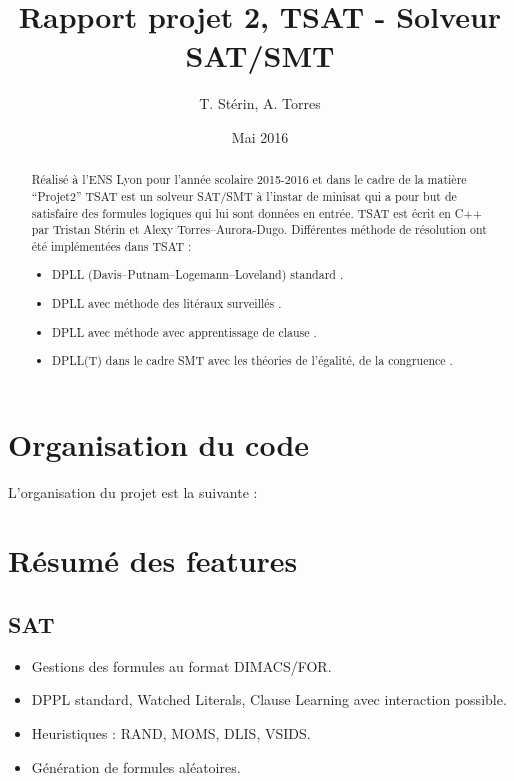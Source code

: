 \documentclass{article}
\title{Rapport projet 2, TSAT - Solveur SAT/SMT}
\author{T. Stérin, A. Torres}
\date{Mai 2016}
\newcommand{\litt}{\alpha}
\newcommand{\non}[1]{\overline{#1}}
\begin{document}
\maketitle

\begin{abstract}
Réalisé à l'ENS Lyon pour l'année scolaire 2015-2016 et dans le cadre de la matière ``Projet2'' TSAT est un solveur SAT/SMT à l'instar de minisat \cite{minisat} qui a pour but de satisfaire des formules logiques qui lui sont données en entrée.
TSAT est écrit en C++ par Tristan Stérin et Alexy Torres--Aurora-Dugo.
Différentes méthode de résolution ont été implémentées dans TSAT : 
\begin{itemize}
	\item DPLL (Davis–Putnam–Logemann–Loveland) standard \cite{DPLL}.
	\item DPLL avec méthode des litéraux surveillés \cite{WL}.
	\item DPLL avec méthode avec apprentissage de clause \cite{CL}.
	\item DPLL(T) dans le cadre SMT avec les théories de l'égalité, de la congruence \cite{SMT}. 
\end{itemize}
\end{abstract}

\section{Organisation du code}
L'organisation du projet est la suivante :
\newpage

\section{Résumé des features}
\subsection{SAT}
\begin{itemize}
\item Gestions des formules au format DIMACS/FOR.
\item DPPL standard, Watched Literals, Clause Learning avec interaction possible.
\item Heuristiques : RAND, MOMS, DLIS, VSIDS.
\item Génération de formules aléatoires.
\end{itemize}
\end{document}
